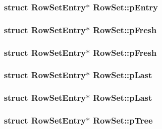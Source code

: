 \subsubsection{\setlength{\rightskip}{0pt plus 5cm}struct \bf{Row\-Set\-Entry}$\ast$ \bf{Row\-Set::p\-Entry}}\label{structRowSet_7b7cb44d5fe17e142c1b07569909bf75}


\subsubsection{\setlength{\rightskip}{0pt plus 5cm}struct \bf{Row\-Set\-Entry}$\ast$ \bf{Row\-Set::p\-Fresh}}\label{structRowSet_b049d4fd1780f1980f62e962704ec1e4}


\subsubsection{\setlength{\rightskip}{0pt plus 5cm}struct \bf{Row\-Set\-Entry}$\ast$ \bf{Row\-Set::p\-Fresh}}\label{structRowSet_b049d4fd1780f1980f62e962704ec1e4}


\subsubsection{\setlength{\rightskip}{0pt plus 5cm}struct \bf{Row\-Set\-Entry}$\ast$ \bf{Row\-Set::p\-Last}}\label{structRowSet_967fbc7244ea2f96c5192f5305a6a61a}


\subsubsection{\setlength{\rightskip}{0pt plus 5cm}struct \bf{Row\-Set\-Entry}$\ast$ \bf{Row\-Set::p\-Last}}\label{structRowSet_967fbc7244ea2f96c5192f5305a6a61a}


\subsubsection{\setlength{\rightskip}{0pt plus 5cm}struct \bf{Row\-Set\-Entry}$\ast$ \bf{Row\-Set::p\-Tree}}\label{structRowSet_3839627e2aceb7648646a72d69694b25}


